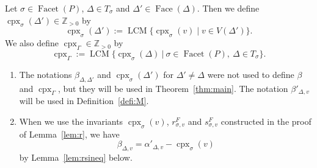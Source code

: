 Let $\sigma \in \operatorname{Facet}(P)$, $\Delta \in T_{\sigma}$ and $\Delta ' \in \operatorname{Face}(\Delta)$. 
Then we define $\operatorname{cpx}_{\sigma}(\Delta ') \in \mathbb{Z}_{>0}$ by 
\[
\operatorname{cpx}_{\sigma}(\Delta ') := 
\operatorname{LCM}\{ \operatorname{cpx}_{\sigma}(v) \mid v \in V(\Delta ') \}. 
\]
We also define $\operatorname{cpx}_{\Gamma} \in \mathbb{Z}_{>0}$ by
\[
\operatorname{cpx}_{\Gamma} :=
\operatorname{LCM} \bigl\{ \operatorname{cpx}_{\sigma}(\Delta) \ \big | \ \sigma \in \operatorname{Facet}(P),\ \Delta \in T_{\sigma} \bigr \}. 
\]


\begin{rmk}\label{rmk:ineq}
\begin{enumerate}
\item 
The notations $\beta _{\Delta, \Delta '}$ and $\operatorname{cpx}_{\sigma}(\Delta ')$ for $\Delta ' \not = \Delta$ 
were not used to define $\beta$ and $\operatorname{cpx}_{\Gamma}$, but they will be used in Theorem~\ref{thm:main}. 
The notation $\beta ' _{\Delta, v}$ will be used in Definition~\ref{defi:M}. 

\item
When we use the invariants $\operatorname{cpx}_{\sigma}(v)$, $r_{\sigma, v}^F$ and $s_{\sigma, v}^F$ constructed in the proof of Lemma~\ref{lem:r}, we have 
\[
\beta_{\Delta, v} = \alpha ' _{\Delta, v} - \operatorname{cpx}_{\sigma}(v)
\]
by Lemma~\ref{lem:rsineq} below. 
\end{enumerate}
\end{rmk}

